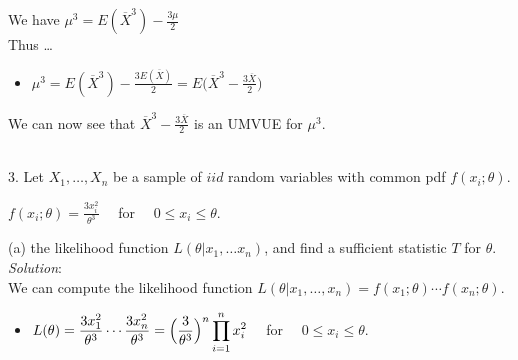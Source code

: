 \documentclass[12pt]{article}
\newcommand{\XB}{\color{black}}
\newcommand{\XBB}{\color{blue}}
\newcommand{\ds}{\displaystyle}
\begin{document}
\noindent
We have $ \ds \mu^{3} = E(\overline{X}^{3}) - \frac{3\mu}{2} $ \\

Thus \dots

\begin{itemize}
    \item $ \ds \mu^{3} = E(\overline{X}^{3}) - \frac{3E(\overline{X})}{2} = E \Biggl( \overline{X}^{3} - \frac{3\overline{X}}{2} \Biggr)$
\end{itemize}

\noindent
We can now see that $ \ds \overline{X}^{3} - \frac{3\overline{X}}{2} $ is an UMVUE for $ \mu^{3} $. \\

\vspace{2.5mm}

\newpage
\XBB\hrulefill\XB \\

3. Let $ X_{1},\dots,X_{n} $ be a sample of $ iid $ random variables with common pdf $ f(x_{i}; \theta) $. \\

\begin{center}
    $ \ds f(x_{i}; \theta) = \frac{3x_{i}^{2}}{\theta^{3}} \quad $ for $ \quad 0 \le x_{i} \le \theta $.
\end{center}

\XBB\hrulefill\XB
\vspace{5mm}

(a) the likelihood function $ L(\theta | x_{1}, \dots x_{n}) $, and find a sufficient statistic $ T $ for $ \theta $.
\vspace{2.5mm} \\
\textit{Solution}:
\vspace{2.5mm} \\

\noindent
We can compute the likelihood function $ L(\theta | x_{1}, \dots, x_{n}) = f(x_{1}; \theta) \cdots f(x_{n}; \theta) $.

\begin{itemize}
    \item $ \ds L(\theta) = \frac{3x_{1}^{2}}{\theta^{3}} \cdots \frac{3x_{n}^{2}}{\theta^{3}} = \Bigl( \frac{3}{\theta^{3}} \Bigr)^{n} \prod_{i=1}^{n} x_{i}^{2} \quad $ for $ \quad 0 \le x_{i} \le \theta $.
\end{itemize}
\end{document}

